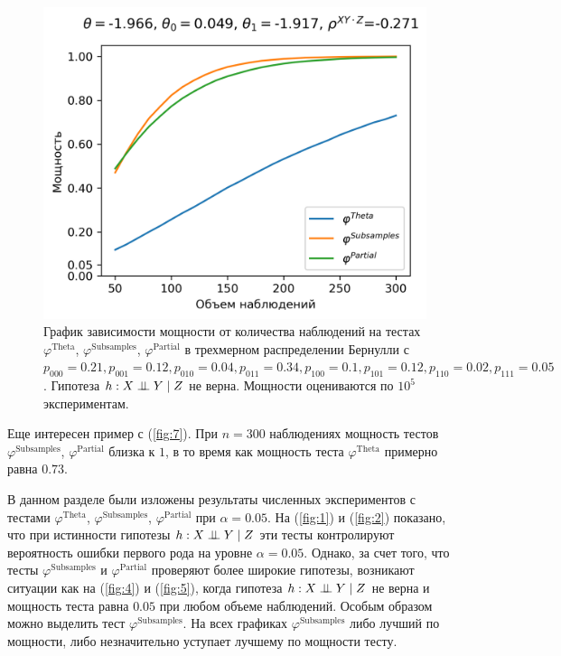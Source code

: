 \begin{figure}[H]
    \centering
    \includegraphics[scale=0.55]{images/graph7.png}
    \caption{График зависимости мощности от количества наблюдений
    на тестах $\varphi^{\text{Theta}}$, $\varphi^{\text{Subsamples}}$, $\varphi^{\text{Partial}}$
    в трехмерном распределении Бернулли с $p_{000}=0.21, p_{001}=0.12, 
    p_{010}=0.04, p_{011}=0.34,
    p_{100}=0.1, p_{101}=0.12, p_{110}=0.02, p_{111}=0.05$. 
    Гипотеза $h: X \perp\!\!\!\perp Y \mid Z$ не верна.
    Мощности оцениваются по $10^5$ экспериментам.} \label{fig:7}
\end{figure}

Еще интересен пример с (\autoref{fig:7}). 
При $n=300$ наблюдениях мощность тестов
$\varphi^{\text{Subsamples}}$, $\varphi^{\text{Partial}}$ близка к $1$,
в то время как мощность теста $\varphi^{\text{Theta}}$ примерно равна $0.73$.

В данном разделе были изложены результаты численных экспериментов с тестами
$\varphi^{\text{Theta}}$, $\varphi^{\text{Subsamples}}$, 
$\varphi^{\text{Partial}}$ при $\alpha=0.05$. На 
(\autoref{fig:1}) и (\autoref{fig:2}) показано, что 
при истинности гипотезы  
$h: X \perp\!\!\!\perp Y \mid Z$ эти тесты контролируют вероятность ошибки первого рода
на уровне $\alpha=0.05$. 
Однако, за счет того, что тесты 
$\varphi^{\text{Subsamples}}$ и
$\varphi^{\text{Partial}}$ проверяют более широкие гипотезы,
возникают ситуации как на 
 (\autoref{fig:4}) и (\autoref{fig:5}), когда гипотеза $h: X \perp\!\!\!\perp Y \mid Z$
не верна и мощность теста равна $0.05$ при любом объеме наблюдений.
Особым образом можно выделить тест $\varphi^{\text{Subsamples}}$.
На всех графиках $\varphi^{\text{Subsamples}}$ либо лучший по мощности,
либо незначительно уступает лучшему по мощности тесту.
